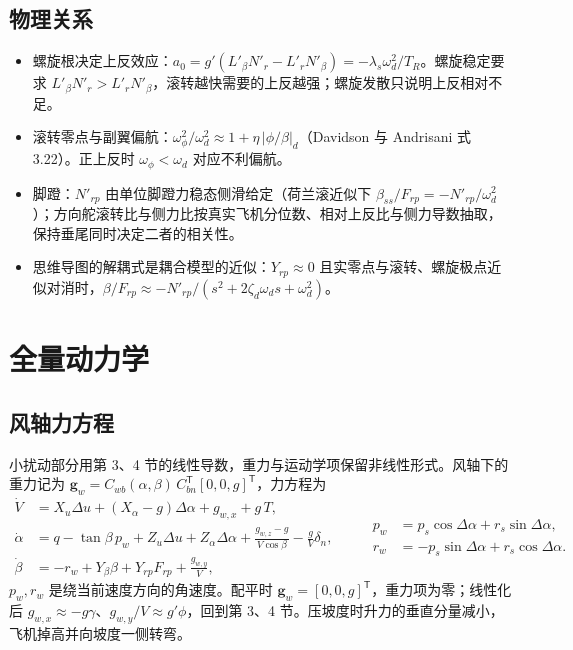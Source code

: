 \documentclass[UTF8,a4paper,11pt,fontset=fandol,scheme=plain]{ctexart}
\begin{document}
\subsection{物理关系}
\begin{itemize}[leftmargin=1.5em]
\item 螺旋根决定上反效应：\(a_0=g'(L'_\beta N'_r-L'_rN'_\beta)=-\lambda_s\omega_d^2/T_R\)。螺旋稳定要求 \(L'_\beta N'_r>L'_rN'_\beta\)，滚转越快需要的上反越强；螺旋发散只说明上反相对不足。
\item 滚转零点与副翼偏航：\(\omega_\phi^2/\omega_d^2\approx1+\eta\,|\phi/\beta|_d\)（Davidson 与 Andrisani 式 3.22）。正上反时 \(\omega_\phi<\omega_d\) 对应不利偏航。
\item 脚蹬：\(N'_{rp}\) 由单位脚蹬力稳态侧滑给定（荷兰滚近似下 \(\beta_{ss}/F_{rp}=-N'_{rp}/\omega_d^2\)）；方向舵滚转比与侧力比按真实飞机分位数、相对上反比与侧力导数抽取，保持垂尾同时决定二者的相关性。
\item 思维导图的解耦式是耦合模型的近似：\(Y_{rp}\approx0\) 且实零点与滚转、螺旋极点近似对消时，\(\beta/F_{rp}\approx-N'_{rp}/(s^2+2\zeta_d\omega_d s+\omega_d^2)\)。
\end{itemize}

\section{全量动力学}
\label{sec:full}
\subsection{风轴力方程}
小扰动部分用第 3、4 节的线性导数，重力与运动学项保留非线性形式。风轴下的重力记为 \(\mathbf g_w=C_{wb}(\alpha,\beta)\,C_{bn}^{\mathsf T}[0,0,g]^{\mathsf T}\)，力方程为
\begin{equation}
\begin{aligned}
\dot V&=X_u\Delta u+(X_\alpha-g)\Delta\alpha+g_{w,x}+g\,T,\\
\dot\alpha&=q-\tan\beta\,p_w+Z_u\Delta u+Z_\alpha\Delta\alpha+\frac{g_{w,z}-g}{V\cos\beta}-\frac{g}{V}\delta_n,\\
\dot\beta&=-r_w+Y_\beta\beta+Y_{rp}F_{rp}+\frac{g_{w,y}}{V},
\end{aligned}
\qquad
\begin{aligned}
p_w&=p_s\cos\Delta\alpha+r_s\sin\Delta\alpha,\\
r_w&=-p_s\sin\Delta\alpha+r_s\cos\Delta\alpha .
\end{aligned}
\end{equation}
\(p_w,r_w\) 是绕当前速度方向的角速度。配平时 \(\mathbf g_w=[0,0,g]^{\mathsf T}\)，重力项为零；线性化后 \(g_{w,x}\approx-g\gamma\)、\(g_{w,y}/V\approx g'\phi\)，回到第 3、4 节。压坡度时升力的垂直分量减小，飞机掉高并向坡度一侧转弯。
\end{document}
